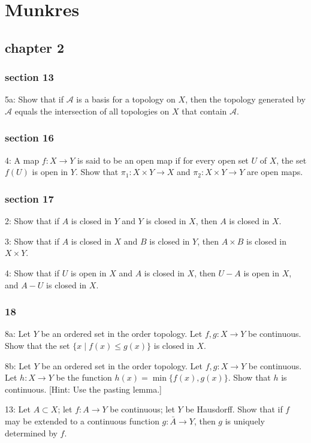 \documentclass{article}
\begin{document}
\section*{Munkres}
\subsection*{chapter 2}
\subsubsection*{section 13}
5a: Show that if $\mathcal{A}$ is a basis for a topology on $X$, then the topology generated by $\mathcal{A}$ equals the intersection of all topologies on $X$ that contain $\mathcal{A}$. 

\subsubsection*{section 16}
4: A map $f: X \rightarrow Y$ is said to be an open map if for every open set $U$ of $X$, the set $f(U)$ is open in $Y$. Show that $\pi_{1}: X \times Y \rightarrow X$ and $\pi_{2}: X \times Y \rightarrow Y$ are open maps.

\subsubsection*{section 17}
2: Show that if $A$ is closed in $Y$ and $Y$ is closed in $X$, then $A$ is closed in $X$.

3: Show that if $A$ is closed in $X$ and $B$ is closed in $Y$, then $A \times B$ is closed in $X \times Y$.

4: Show that if $U$ is open in $X$ and $A$ is closed in $X$, then $U-A$ is open in $X$, and $A-U$ is closed in $X$.

\subsubsection*{18}
8a: Let $Y$ be an ordered set in the order topology. Let $f, g: X \rightarrow Y$ be continuous. Show that the set $\{x \mid f(x) \leq g(x)\}$ is closed in $X$.

8b: Let $Y$ be an ordered set in the order topology. Let $f, g: X \rightarrow Y$ be continuous. Let $h: X \rightarrow Y$ be the function $h(x)=\min \{f(x), g(x)\}.$ Show that $h$ is continuous. [Hint: Use the pasting lemma.] 

13: Let $A \subset X$; let $f: A \rightarrow Y$ be continuous; let $Y$ be Hausdorff. Show that if $f$ may be extended to a continuous function $g: \bar{A} \rightarrow Y$, then $g$ is uniquely determined by $f$.
\end{document}

